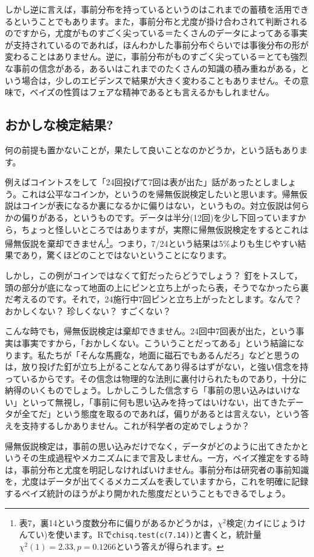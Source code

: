 \documentclass{ltjsarticle}
\begin{document}
しかし逆に言えば，事前分布を持っているというのはこれまでの蓄積を活用できるということでもあります。また，事前分布と尤度が掛け合わされて判断されるのですから，尤度がものすごく尖っている＝たくさんのデータによってある事実が支持されているのであれば，ほんわかした事前分布ぐらいでは事後分布の形が変わることはありません。逆に，事前分布がものすごく尖っている＝とても強烈な事前の信念がある，あるいはこれまでのたくさんの知識の積み重ねがある，という場合は，少しのエビデンスで結果が大きく変わることもありません。その意味で，ベイズの性質はフェアな精神であるとも言えるかもしれません。
\subsection{おかしな検定結果? }
何の前提も置かないことが，果たして良いことなのかどうか，という話もあります\citep{Maeda2017}。

例えばコイントスをして「24回投げて7回は表が出た」話があったとしましょう。これは公平なコインか，というのを帰無仮説検定したいと思います。帰無仮説はコインが表になるか裏になるかに偏りはない，というもの。対立仮説は何らかの偏りがある，というものです。データは半分(12回)を少し下回っていますから，ちょっと怪しいところではありますが，実際に帰無仮説検定をするとこれは帰無仮説を棄却できません\footnote{表7，裏14という度数分布に偏りがあるかどうかは，$\chi^2$検定(カイにじょうけんてい)を使います。Rで\texttt{chisq.test(c(7.14))}と書くと，統計量$\chi^2(1)=2.33,p=0.1266$という答えが得られます。}。つまり，7/24という結果は5\%よりも生じやすい結果であり，驚くほどのことではないということになります。

しかし，この例がコインではなくて釘だったらどうでしょう？ 釘をトスして，頭の部分が底になって地面の上にピンと立ち上がったら表，そうでなかったら裏だ考えるのです。それで，24施行中7回ピンと立ち上がったとします。なんで？ おかしくない？ 珍しくない？ すごくない？ 

こんな時でも，帰無仮説検定は棄却できません。24回中7回表が出た，という事実は事実ですから，「おかしくない。こういうことだってある」という結論になります。私たちが「そんな馬鹿な，地面に磁石でもあるんだろ」などと思うのは，放り投げた釘が立ち上がることなんてあり得るはずがない，と強い信念を持っているからです。その信念は物理的な法則に裏付けられたものであり，十分に納得のいくものでしょう。しかしこうした信念すら「事前の思い込みはいけない」といって無視し，「事前に何も思い込みを持ってはいけない，出てきたデータが全てだ」という態度を取るのであれば，偏りがあるとは言えない，という答えを支持するしかありません。これが科学者の定めでしょうか？ 

帰無仮説検定は，事前の思い込みだけでなく，データがどのように出てきたかというその生成過程やメカニズムにまで言及しません。一方，ベイズ推定をする時は，事前分布と尤度を明記しなければいけません。事前分布は研究者の事前知識を，尤度はデータが出てくるメカニズムを表していますから，これを明確に記録するベイズ統計のほうがより開かれた態度だということもできるでしょう。
\end{document}

